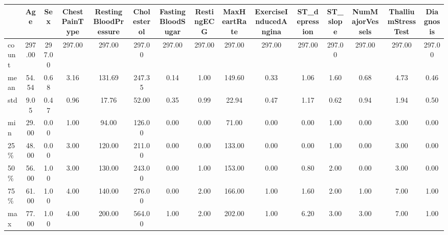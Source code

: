 \begin{tabular}{lcccccccccccccc}
\toprule
{} &    Age &    Sex &  ChestPainType &  RestingBloodPressure &  Cholesterol &  FastingBloodSugar &  RestingECG &  MaxHeartRate &  ExerciseInducedAngina &  ST\_depression &  ST\_slope &  NumMajorVessels &  ThalliumStressTest &  Diagnosis \\
\midrule
count & 297.00 & 297.00 &         297.00 &                297.00 &       297.00 &             297.00 &      297.00 &        297.00 &                 297.00 &         297.00 &    297.00 &           297.00 &              297.00 &     297.00 \\
mean  &  54.54 &   0.68 &           3.16 &                131.69 &       247.35 &               0.14 &        1.00 &        149.60 &                   0.33 &           1.06 &      1.60 &             0.68 &                4.73 &       0.46 \\
std   &   9.05 &   0.47 &           0.96 &                 17.76 &        52.00 &               0.35 &        0.99 &         22.94 &                   0.47 &           1.17 &      0.62 &             0.94 &                1.94 &       0.50 \\
min   &  29.00 &   0.00 &           1.00 &                 94.00 &       126.00 &               0.00 &        0.00 &         71.00 &                   0.00 &           0.00 &      1.00 &             0.00 &                3.00 &       0.00 \\
25\%   &  48.00 &   0.00 &           3.00 &                120.00 &       211.00 &               0.00 &        0.00 &        133.00 &                   0.00 &           0.00 &      1.00 &             0.00 &                3.00 &       0.00 \\
50\%   &  56.00 &   1.00 &           3.00 &                130.00 &       243.00 &               0.00 &        1.00 &        153.00 &                   0.00 &           0.80 &      2.00 &             0.00 &                3.00 &       0.00 \\
75\%   &  61.00 &   1.00 &           4.00 &                140.00 &       276.00 &               0.00 &        2.00 &        166.00 &                   1.00 &           1.60 &      2.00 &             1.00 &                7.00 &       1.00 \\
max   &  77.00 &   1.00 &           4.00 &                200.00 &       564.00 &               1.00 &        2.00 &        202.00 &                   1.00 &           6.20 &      3.00 &             3.00 &                7.00 &       1.00 \\
\bottomrule
\end{tabular}
